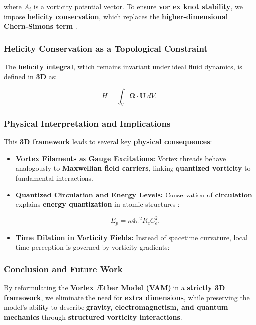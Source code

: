     where \( A_i \) is a vorticity potential vector. To ensure \textbf{vortex knot stability}, we impose \textbf{helicity conservation}, which replaces the \textbf{higher-dimensional Chern-Simons term} \cite{witten1989quantum}.

    \subsubsection*{Helicity Conservation as a Topological Constraint}
    The \textbf{helicity integral}, which remains invariant under ideal fluid dynamics, is defined in \textbf{3D} as:

    \begin{equation*}
        H = \int_V \boldsymbol{\Omega} \cdot \mathbf{U} \ dV.
    \end{equation*}

    \subsubsection*{Physical Interpretation and Implications}
    This \textbf{3D framework} leads to several key \textbf{physical consequences}:

    \begin{itemize}
        \item \textbf{Vortex Filaments as Gauge Excitations:}
        Vortex threads behave analogously to \textbf{Maxwellian field carriers}, linking \textbf{quantized vorticity} to fundamental interactions.

        \item \textbf{Quantized Circulation and Energy Levels:}
        Conservation of \textbf{circulation} explains \textbf{energy quantization} in atomic structures \cite{feynman1951quantum}:

        \begin{equation*}
            E_p = \kappa 4\pi^2 R_c C_e^2.
        \end{equation*}

        \item \textbf{Time Dilation in Vorticity Fields:}
        Instead of spacetime curvature, local time perception is governed by vorticity gradients:


\end{itemize}



    \subsubsection*{Conclusion and Future Work}
    By reformulating the \textbf{Vortex Æther Model (VAM)} in a \textbf{strictly 3D framework}, we eliminate the need for \textbf{extra dimensions}, while preserving the model's ability to describe \textbf{gravity, electromagnetism, and quantum mechanics} through \textbf{structured vorticity interactions}.

